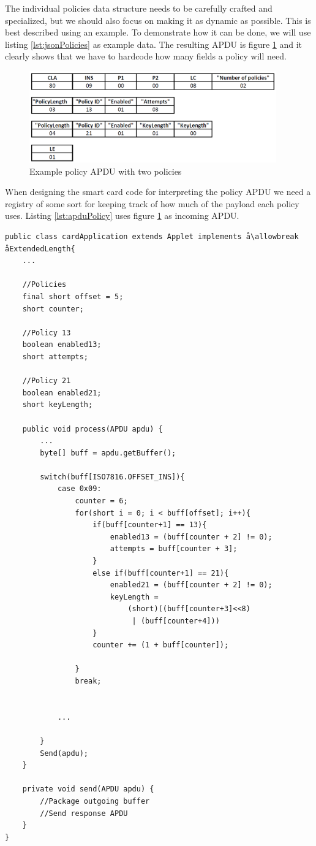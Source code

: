 The individual policies data structure needs to be carefully crafted and specialized, but we should also focus on making it as dynamic as possible. This is best described using an example. To demonstrate how it can be done, we will use listing \ref{lst:jsonPolicies} as example data. The resulting APDU is figure \ref{fig:policyAPDU} and it clearly shows that we have to hardcode how many fields a policy will need.

\begin{figure}[h!]
  \caption{Example policy APDU with two policies}
  \label{fig:policyAPDU}
  \centering
    \includegraphics[width=0.95\textwidth]{images/policyAPDU.png}
\end{figure}

When designing the smart card code for interpreting the policy APDU we need a registry of some sort for keeping track of how much of the payload each policy uses. Listing \ref{lst:apduPolicy} uses figure \ref{fig:policyAPDU} as incoming APDU.

\begin{lstlisting}[caption=Pseudo code for interpreting policy APDU with java smart card., label=lst:apduPolicy,escapechar=å]
public class cardApplication extends Applet implements å\allowbreak åExtendedLength{
    ...

    //Policies
    final short offset = 5;
    short counter;

    //Policy 13
    boolean enabled13;
    short attempts;

    //Policy 21
    boolean enabled21;
    short keyLength;

    public void process(APDU apdu) {
    	...
        byte[] buff = apdu.getBuffer();

    	switch(buff[ISO7816.OFFSET_INS]){
            case 0x09:
                counter = 6;
                for(short i = 0; i < buff[offset]; i++){
                    if(buff[counter+1] == 13){
                        enabled13 = (buff[counter + 2] != 0);
                        attempts = buff[counter + 3];
                    }
                    else if(buff[counter+1] == 21){
                        enabled21 = (buff[counter + 2] != 0);
                        keyLength =
                            (short)((buff[counter+3]<<8)
                             | (buff[counter+4]))
                    }
                    counter += (1 + buff[counter]);

                }
                break;


            ...

    	}
    	Send(apdu);
    }

    private void send(APDU apdu) {
    	//Package outgoing buffer
    	//Send response APDU
    }
}
\end{lstlisting}

